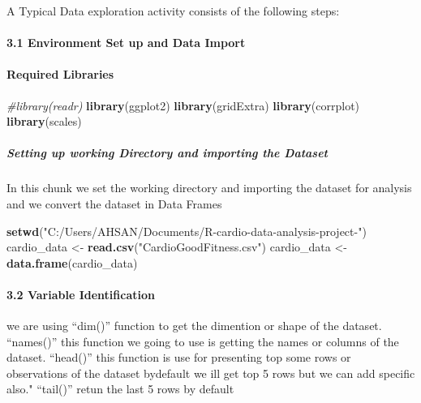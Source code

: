 \documentclass[
]{article}
\newenvironment{Shaded}{\begin{snugshade}}{\end{snugshade}}
\newcommand{\CommentTok}[1]{\textcolor[rgb]{0.56,0.35,0.01}{\textit{#1}}}
\newcommand{\KeywordTok}[1]{\textcolor[rgb]{0.13,0.29,0.53}{\textbf{#1}}}
\newcommand{\NormalTok}[1]{#1}
\newcommand{\StringTok}[1]{\textcolor[rgb]{0.31,0.60,0.02}{#1}}
\begin{document}
A Typical Data exploration activity consists of the following steps:

\hypertarget{environment-set-up-and-data-import}{%
\paragraph{3.1 Environment Set up and Data
Import}\label{environment-set-up-and-data-import}}

\hypertarget{required-libraries}{%
\paragraph{Required Libraries}\label{required-libraries}}

\begin{Shaded}
\begin{Highlighting}[]
\CommentTok{#library(readr)}
\KeywordTok{library}\NormalTok{(ggplot2)}
\KeywordTok{library}\NormalTok{(gridExtra)}
\KeywordTok{library}\NormalTok{(corrplot)}
\KeywordTok{library}\NormalTok{(scales)}
\end{Highlighting}
\end{Shaded}

\hypertarget{setting-up-working-directory-and-importing-the-dataset}{%
\subparagraph{Setting up working Directory and importing the
Dataset}\label{setting-up-working-directory-and-importing-the-dataset}}

In this chunk we set the working directory and importing the dataset for
analysis and we convert the dataset in Data Frames

\begin{Shaded}
\begin{Highlighting}[]
\KeywordTok{setwd}\NormalTok{(}\StringTok{"C:/Users/AHSAN/Documents/R-cardio-data-analysis-project-"}\NormalTok{)}
\NormalTok{cardio_data <-}\StringTok{ }\KeywordTok{read.csv}\NormalTok{(}\StringTok{"CardioGoodFitness.csv"}\NormalTok{)}
\NormalTok{cardio_data <-}\StringTok{ }\KeywordTok{data.frame}\NormalTok{(cardio_data)}
\end{Highlighting}
\end{Shaded}

\hypertarget{variable-identification}{%
\paragraph{3.2 Variable Identification}\label{variable-identification}}

we are using ``dim()'' function to get the dimention or shape of the
dataset. ``names()'' this function we going to use is getting the names
or columns of the dataset. ``head()'' this function is use for
presenting top some rows or observations of the dataset bydefault we ill
get top 5 rows but we can add specific also." ``tail()'' retun the last
5 rows by default
\end{document}
